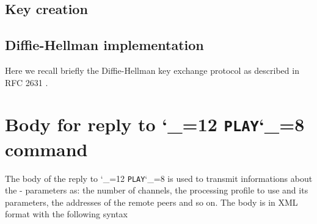 \documentclass{rfc}
\def\ttt{\catcode`\_=12 \tttii}
\def\tttii#1!{{\tt #1}\catcode`\_=8{}}
\begin{document}
\subsection{Key creation}
\label{subsect:key-creation}

\subsection{Diffie-Hellman implementation}
\label{subsect:diffie}

Here we recall briefly the Diffie-Hellman key exchange protocol as
described in RFC 2631 \cite{rfc2631}.

\section{Body for reply to \protect\ttt PLAY! command}
\label{sect:3.2;transport_layer}

The body of the reply to \ttt PLAY! is used to transmit informations
about the \ppetp- parameters as: the number of channels, the
processing profile to use and its parameters, the addresses of the
remote peers and so on.  The body is in XML format with the following
syntax



% 
% 
\end{document}
